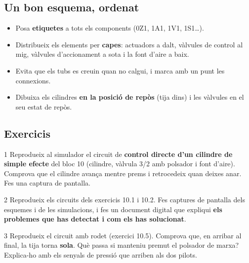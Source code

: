 \subsection*{Un bon esquema, ordenat}

\begin{itemize}
 \item Posa \textbf{etiquetes} a tots els components (0Z1, 1A1, 1V1, 1S1\ldots).
 \item Distribueix els elements per \textbf{capes}: actuadors a dalt, vàlvules de control al mig, vàlvules d'accionament a sota i la font d'aire a baix.
 \item Evita que els tubs es creuin quan no calgui, i marca amb un punt les connexions.
 \item Dibuixa els cilindres \textbf{en la posició de repòs} (tija dins) i les vàlvules en el seu estat de repòs.
\end{itemize}

\subsection*{Exercicis}

\begin{exercici}{1}
Reprodueix al simulador el circuit de \textbf{control directe d'un cilindre de simple efecte} del bloc 10 (cilindre, vàlvula 3/2 amb polsador i font d'aire). Comprova que el cilindre avança mentre prems i retrocedeix quan deixes anar. Fes una captura de pantalla.
\end{exercici}

\begin{exercici}{2}
Reprodueix els circuits dels exercicis 10.1 i 10.2. Fes captures de pantalla dels esquemes i de les simulacions, i fes un document digital que expliqui \textbf{els problemes que has detectat i com els has solucionat}.
\end{exercici}

\begin{exercici}{3}
Reprodueix el circuit amb rodet (exercici 10.5). Comprova que, en arribar al final, la tija torna \textbf{sola}. Què passa si manteniu premut el polsador de marxa? Explica-ho amb els senyals de pressió que arriben als dos pilots.
\end{exercici}

